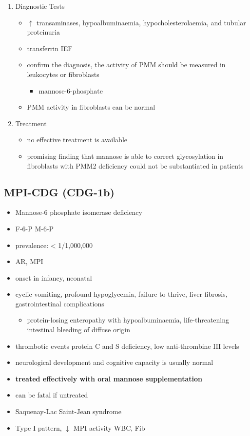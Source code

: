 \documentclass{scrartcl}
\begin{document}
\begin{enumerate}
\item Diagnostic Tests
\label{sec:org1b15943}
\begin{itemize}
\item \(\uparrow\) transaminases, hypoalbuminaemia, hypocholesterolaemia, and
tubular proteinuria
\item transferrin IEF
\item confirm the diagnosis, the activity of PMM should be measured in
leukocytes or fibroblasts
\begin{itemize}
\item\relax [2-H\(^{\text{3}}\)]mannose-6-phosphate
\end{itemize}
\item PMM activity in fibroblasts can be normal
\end{itemize}

\item Treatment
\label{sec:org8430e1a}
\begin{itemize}
\item no effective treatment is available
\item promising finding that mannose is able to correct glycosylation
in fibroblasts with PMM2 deficiency could not be substantiated in
patients
\end{itemize}
\end{enumerate}

\subsection{MPI-CDG (CDG-1b)}
\label{sec:org481fcb9}
\begin{itemize}
\item Mannose-6 phosphate isomerase deficiency
\item F-6-P \ce{<=>} M-6-P

\item prevalence: \textless{} 1/1,000,000
\item AR, MPI
\item onset in infancy, neonatal

\item cyclic vomiting, profound hypoglycemia, failure to thrive, liver
fibrosis, gastrointestinal complications
\begin{itemize}
\item protein-losing enteropathy with hypoalbuminaemia, life-threatening
intestinal bleeding of diffuse origin
\end{itemize}
\item thrombotic events protein C and S deficiency, low anti-thrombine III levels
\item neurological development and cognitive capacity is usually normal
\item \textbf{treated effectively with oral mannose supplementation}
\item can be fatal if untreated
\item Saquenay-Lac Saint-Jean syndrome
\item Type I pattern, \(\downarrow\) MPI activity WBC, Fib
\end{itemize}
\end{document}
